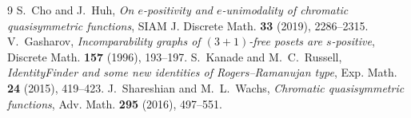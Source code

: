 \documentclass[11pt]{article}
\theoremstyle{definition}
\begin{document}
\begin{thebibliography}{9}
 S.~Cho and J.~Huh, \emph{On $e$-positivity and $e$-unimodality of chromatic quasisymmetric functions}, SIAM J. Discrete Math. \textbf{33} (2019), 2286--2315.
 V.~Gasharov, \emph{Incomparability graphs of $(3+1)$-free posets are $s$-positive}, Discrete Math. \textbf{157} (1996), 193--197.
 S.~Kanade and M.~C.~Russell, \emph{IdentityFinder and some new identities of Rogers--Ramanujan type}, Exp. Math. \textbf{24} (2015), 419--423.
 J.~Shareshian and M.~L.~Wachs, \emph{Chromatic quasisymmetric functions}, Adv. Math. \textbf{295} (2016), 497--551.
\end{thebibliography}
\end{document}

